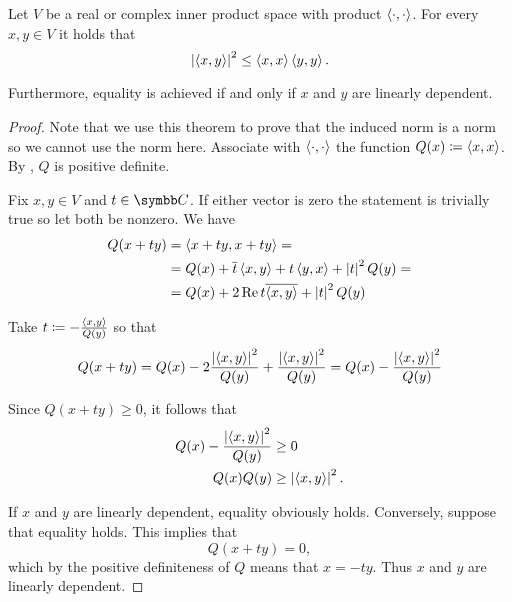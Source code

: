 \begin{theorem}\label{thm:cauchy_bunyakovsky_schwarz_inequality}
  Let \( V \) be a real or complex inner product space with product \( \left\langle \cdot, \cdot \right\rangle \). For every \( x, y \in V \) it holds that
  \begin{equation}\label{thm:cauchy_bunyakovsky_schwarz_inequality/inequality}
    {\left\vert \left\langle x, y \right\rangle \right\vert}^2 \leq \left\langle x, x \right\rangle \left\langle y, y \right\rangle.
  \end{equation}

  Furthermore, equality is achieved if and only if \( x \) and \( y \) are linearly dependent.
\end{theorem}
\begin{proof}
  Note that we use this theorem to prove that the induced norm is a norm so we cannot use the norm here. Associate with \( \left\langle \cdot, \cdot \right\rangle \) the function \( Q(x) \coloneqq \left\langle x, x \right\rangle \). By , \( Q \) is positive definite.

  Fix \( x, y \in V \) and \( t \in \BC \). If either vector is zero the statement is trivially true so let both be nonzero. We have
  \begin{align*}
    Q(x + ty)
    &=
    \left\langle x + ty, x + ty \right\rangle
    = \\ &=
    Q(x) + \overline{t} \left\langle x, y \right\rangle + t \left\langle y, x \right\rangle + \left\vert t \right\vert^2 Q(y)
    = \\ &=
    Q(x) + 2\operatorname{Re} t \overline{\left\langle x, y \right\rangle} + \left\vert t \right\vert^2 Q(y)
  \end{align*}

  Take \( t \coloneqq - \frac {\left\langle x, y \right\rangle} {Q(y)} \) so that
  \begin{equation*}
    Q(x + ty)
    =
    Q(x) - 2 \frac {\left\vert \left\langle x, y \right\rangle \right\vert^2} {Q(y)} + \frac {\left\vert \left\langle x, y \right\rangle \right\vert^2} {Q(y)}
    =
    Q(x) - \frac {\left\vert \left\langle x, y \right\rangle \right\vert^2} {Q(y)}
  \end{equation*}

  Since \( Q(x + ty) \geq 0 \), it follows that
  \begin{align*}
    Q(x) - \frac {\left\vert \left\langle x, y \right\rangle \right\vert^2} {Q(y)} &\geq 0 \\
    Q(x) Q(y) &\geq \left\vert \left\langle x, y \right\rangle \right\vert^2.
  \end{align*}

  If \( x \) and \( y \) are linearly dependent, equality obviously holds. Conversely, suppose that equality holds. This implies that
  \begin{equation*}
    Q(x + ty) = 0,
  \end{equation*}
  which by the positive definiteness of \( Q \) means that \( x = -ty \). Thus \( x \) and \( y \) are linearly dependent.
\end{proof}

